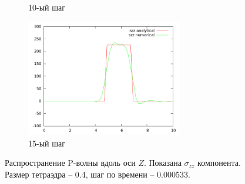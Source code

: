 \begin{figure}[H]
\begin{subfigure}[b]{0.5\textwidth}
\caption{10-ый шаг}
\end{subfigure}
\begin{subfigure}[b]{0.5\textwidth}
\centering
\includegraphics[width=0.75\textwidth]{png/veryfication/0.4/p-wave-along-z15.png}
\caption{15-ый шаг}
\end{subfigure}
\caption{Распространение P-волны вдоль оси $Z$. Показана $\sigma_{zz}$ компонента. Размер тетраэдра -- 0.4, шаг по времени -- 0.000533. }
\label{pic:p_wave_along_z4}
\end{figure}


